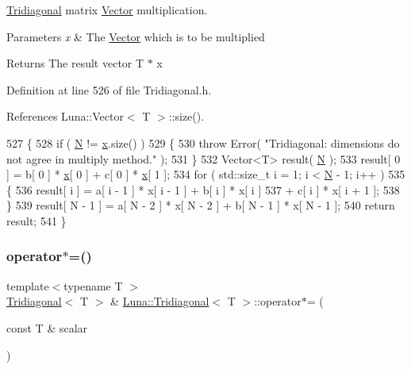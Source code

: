 \hyperlink{classLuna_1_1Tridiagonal}{Tridiagonal} matrix \hyperlink{classLuna_1_1Vector}{Vector} multiplication. 


\begin{DoxyParams}{Parameters}
{\em x} & The \hyperlink{classLuna_1_1Vector}{Vector} which is to be multiplied \\
\hline
\end{DoxyParams}
\begin{DoxyReturn}{Returns}
The result vector T $\ast$ x 
\end{DoxyReturn}


Definition at line 526 of file Tridiagonal.\+h.



References Luna\+::\+Vector$<$ T $>$\+::size().


\begin{DoxyCode}
527   \{
528     \textcolor{keywordflow}{if} ( \hyperlink{namespaceHeat__plot_a7d050092798e28458a263710837bda77}{N} != \hyperlink{namespaceHeat__plot_aa88370c16b85b784ccbde3ed88bc1991}{x}.size() )
529     \{
530       \textcolor{keywordflow}{throw} Error( \textcolor{stringliteral}{"Tridiagonal: dimensions do not agree in multiply method."} );
531     \}
532     Vector<T> result( \hyperlink{namespaceHeat__plot_a7d050092798e28458a263710837bda77}{N} );
533     result[ 0 ] = b[ 0 ] * \hyperlink{namespaceHeat__plot_aa88370c16b85b784ccbde3ed88bc1991}{x}[ 0 ] + c[ 0 ] * \hyperlink{namespaceHeat__plot_aa88370c16b85b784ccbde3ed88bc1991}{x}[ 1 ];
534     \textcolor{keywordflow}{for} ( std::size\_t i = 1; i < \hyperlink{namespaceHeat__plot_a7d050092798e28458a263710837bda77}{N} - 1; i++ )
535     \{
536       result[ i ] = a[ i - 1 ] * x[ i - 1 ] + b[ i ] * x[ i ]
537                   + c[ i ] * x[ i + 1 ];
538     \}
539     result[ N - 1 ] = a[ N - 2 ] * x[ N - 2 ] + b[ N - 1 ] * x[ N - 1 ];
540     \textcolor{keywordflow}{return} result;
541   \}
\end{DoxyCode}
\mbox{\label{classLuna_1_1Tridiagonal_ad2050805abc012920f7c29cbf93989c3}} 
\subsubsection{\texorpdfstring{operator$\ast$=()}{operator*=()}}
{\footnotesize\ttfamily template$<$typename T $>$ \\
\hyperlink{classLuna_1_1Tridiagonal}{Tridiagonal}$<$ T $>$ \& \hyperlink{classLuna_1_1Tridiagonal}{Luna\+::\+Tridiagonal}$<$ T $>$\+::operator$\ast$= (\begin{DoxyParamCaption}\item[{const T \&}]{scalar }\end{DoxyParamCaption})\hspace{0.3cm}{\ttfamily [inline]}}



